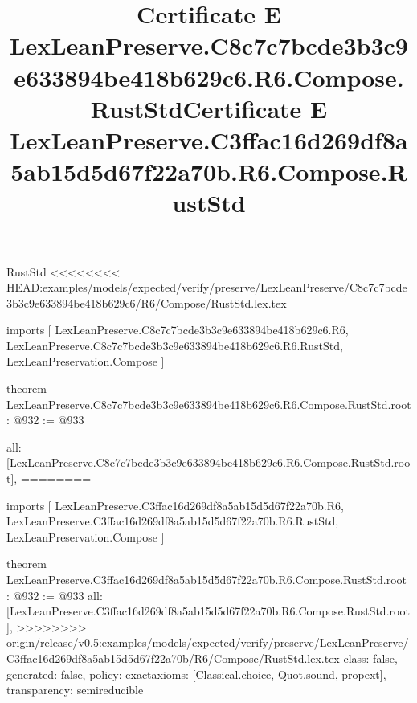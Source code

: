 \begin{lexlean}{RustStd}
<<<<<<<< HEAD:examples/models/expected/verify/preserve/LexLeanPreserve/C8c7c7bcde3b3c9e633894be418b629c6/R6/Compose/RustStd.lex.tex
\title{Certificate E LexLeanPreserve.C8c7c7bcde3b3c9e633894be418b629c6.R6.Compose.RustStd}
\begin{coremodule}
imports [
  LexLeanPreserve.C8c7c7bcde3b3c9e633894be418b629c6.R6,
  LexLeanPreserve.C8c7c7bcde3b3c9e633894be418b629c6.R6.RustStd,
  LexLeanPreservation.Compose
]

theorem LexLeanPreserve.C8c7c7bcde3b3c9e633894be418b629c6.R6.Compose.RustStd.root : @932 := @933 {
  all: [LexLeanPreserve.C8c7c7bcde3b3c9e633894be418b629c6.R6.Compose.RustStd.root],
========
\title{Certificate E LexLeanPreserve.C3ffac16d269df8a5ab15d5d67f22a70b.R6.Compose.RustStd}
\begin{coremodule}
imports [
  LexLeanPreserve.C3ffac16d269df8a5ab15d5d67f22a70b.R6,
  LexLeanPreserve.C3ffac16d269df8a5ab15d5d67f22a70b.R6.RustStd,
  LexLeanPreservation.Compose
]

theorem LexLeanPreserve.C3ffac16d269df8a5ab15d5d67f22a70b.R6.Compose.RustStd.root : @932 := @933 {
  all: [LexLeanPreserve.C3ffac16d269df8a5ab15d5d67f22a70b.R6.Compose.RustStd.root],
>>>>>>>> origin/release/v0.5:examples/models/expected/verify/preserve/LexLeanPreserve/C3ffac16d269df8a5ab15d5d67f22a70b/R6/Compose/RustStd.lex.tex
  class: false,
  generated: false,
  policy: exact{axioms: [Classical.choice, Quot.sound, propext]},
  transparency: semireducible
}


\end{coremodule}}
\end{coremodule}
\end{lexlean}
